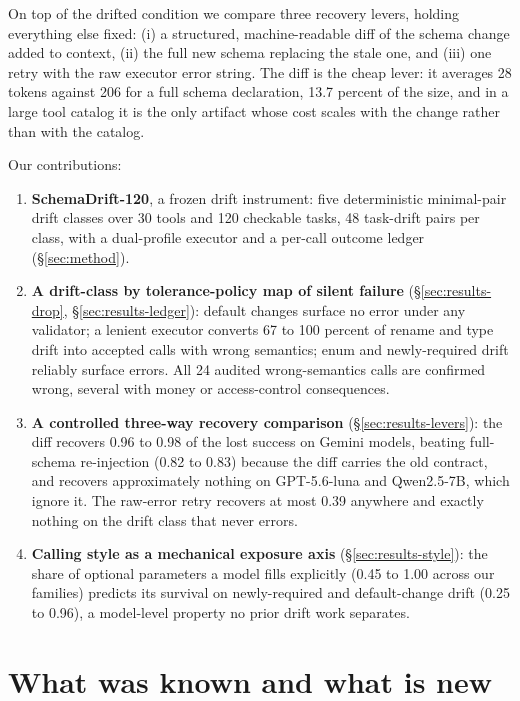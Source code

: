 On top of the drifted condition we compare three recovery levers, holding everything else fixed: (i) a structured, machine-readable diff of the schema change added to context, (ii) the full new schema replacing the stale one, and (iii) one retry with the raw executor error string. The diff is the cheap lever: it averages 28 tokens against 206 for a full schema declaration, 13.7 percent of the size, and in a large tool catalog it is the only artifact whose cost scales with the change rather than with the catalog.

Our contributions:
\begin{enumerate}
\item \textbf{SchemaDrift-120}, a frozen drift instrument: five deterministic minimal-pair drift classes over 30 tools and 120 checkable tasks, 48 task-drift pairs per class, with a dual-profile executor and a per-call outcome ledger (\S\ref{sec:method}).
\item \textbf{A drift-class by tolerance-policy map of silent failure} (\S\ref{sec:results-drop}, \S\ref{sec:results-ledger}): default changes surface no error under any validator; a lenient executor converts 67 to 100 percent of rename and type drift into accepted calls with wrong semantics; enum and newly-required drift reliably surface errors. All 24 audited wrong-semantics calls are confirmed wrong, several with money or access-control consequences.
\item \textbf{A controlled three-way recovery comparison} (\S\ref{sec:results-levers}): the diff recovers 0.96 to 0.98 of the lost success on Gemini models, beating full-schema re-injection (0.82 to 0.83) because the diff carries the old contract, and recovers approximately nothing on GPT-5.6-luna and Qwen2.5-7B, which ignore it. The raw-error retry recovers at most 0.39 anywhere and exactly nothing on the drift class that never errors.
\item \textbf{Calling style as a mechanical exposure axis} (\S\ref{sec:results-style}): the share of optional parameters a model fills explicitly (0.45 to 1.00 across our families) predicts its survival on newly-required and default-change drift (0.25 to 0.96), a model-level property no prior drift work separates.
\end{enumerate}

\section{What was known and what is new}
\label{sec:known}


